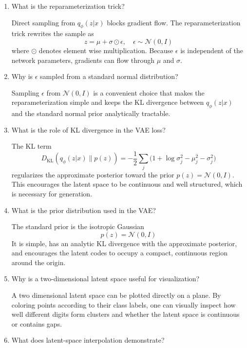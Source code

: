 \documentclass[10pt]{article}
\begin{document}
\begin{enumerate}
\item What is the reparameterization trick?

Direct sampling from \(q_\phi(z|x)\) blocks gradient flow. The reparameterization trick rewrites the sample as
\[
z = \mu + \sigma \odot \epsilon, \quad \epsilon \sim \mathcal{N}(0,I)
\]
where \(\odot\) denotes element wise multiplication. Because \(\epsilon\) is independent of the network parameters, gradients can flow through \(\mu\) and \(\sigma\). \\

\item Why is \(\epsilon\) sampled from a standard normal distribution?

Sampling \(\epsilon\) from \(\mathcal{N}(0,I)\) is a convenient choice that makes the reparameterization simple and keeps the KL divergence between \(q_\phi(z|x)\) and the standard normal prior analytically tractable.\\

\item What is the role of KL divergence in the VAE loss?

The KL term
\[
D_{\text{KL}}(q_\phi(z|x) \| p(z)) = -\frac{1}{2}\sum_j\bigl(1 + \log\sigma_j^2 - \mu_j^2 - \sigma_j^2\bigr)
\]
regularizes the approximate posterior toward the prior \(p(z) = \mathcal{N}(0,I)\). This encourages the latent space to be continuous and well structured, which is necessary for generation.\\

\item What is the prior distribution used in the VAE?

The standard prior is the isotropic Gaussian
\[
p(z) = \mathcal{N}(0,I)
\]
It is simple, has an analytic KL divergence with the approximate posterior, and encourages the latent codes to occupy a compact, continuous region around the origin.\\

\item Why is a two-dimensional latent space useful for visualization?

A two dimensional latent space can be plotted directly on a plane. By coloring points according to their class labels, one can visually inspect how well different digits form clusters and whether the latent space is continuous or contains gaps.\\

\item What does latent-space interpolation demonstrate?


\end{enumerate}
\end{document}

